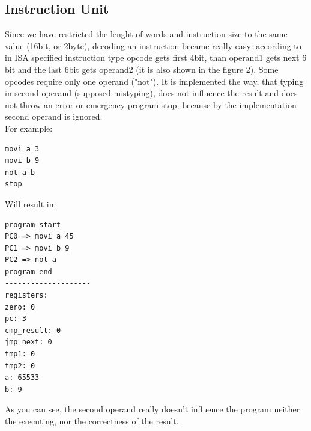 \documentclass[11pt,a4paper]{article}
\begin{document}
\subsection{Instruction Unit}
Since we have restricted the lenght of words and instruction size to the same value (16bit, or 2byte), decoding an instruction became really easy:
according to in ISA specified instruction type opcode gets first 4bit, than operand1 gets next 6 bit and the last 6bit gets operand2 (it is also shown in the figure 2). Some opcodes require only one operand ("not"). It is implemented the way, that typing in second operand (supposed mistyping), does not influence the result and does not throw an error or emergency program stop, because by the implementation second operand is ignored.\\
For example:
\newpage
\begin{verbatim}
movi a 3
movi b 9
not a b
stop
\end{verbatim}
Will result in:
\begin{verbatim}
program start
PC0 => movi a 45
PC1 => movi b 9
PC2 => not a
program end
--------------------
registers:
zero: 0
pc: 3
cmp_result: 0
jmp_next: 0
tmp1: 0
tmp2: 0
a: 65533
b: 9
\end{verbatim}
As you can see, the second operand really doesn't influence the program neither the executing, nor the correctness of the result.\\

\newpage
\end{document}
